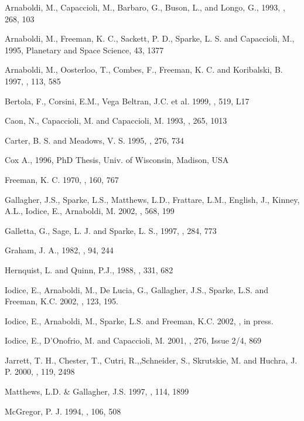 \documentclass{aa}
\begin{document}
\begin{thebibliography}{}

 Arnaboldi, M.,
Capaccioli, M., Barbaro, G., Buson, L., and Longo, G., 1993, \aap, 268, 103

 Arnaboldi, M.,
 Freeman, K. C., Sackett, P. D., Sparke, L. S. and Capaccioli, M., 1995, Planetary and
Space Science, 43, 1377

 Arnaboldi, M., Oosterloo, T., Combes, F., Freeman, K. C. 
and Koribalski, B. 1997, \aj, 113, 585

 Bertola, F., Corsini, E.M., Vega Beltran, J.C. et al. 1999,
\apj, 519, L17 

 Caon, N., Capaccioli, M. and Capaccioli, M. 1993, \mnras, 265, 1013  

 Carter, B. S. and Meadows, V. S. 1995, \mnras, 276, 734  

 Cox A., 1996, PhD Thesis, Univ. of Wisconsin, Madison, USA

 Freeman, K. C. 1970, \apj, 160, 767

 Gallagher, J.S., Sparke, L.S., Matthews, L.D.,
Frattare, L.M., English, J., Kinney, A.L., Iodice, E., Arnaboldi, M. 2002, 
\apj, 568, 199 

 Galletta, G., Sage, L. J.
and Sparke, L. S., 1997, \mnras, 284, 773

 Graham, J. A., 1982, \pasp, 94, 244

 Hernquist, L. and Quinn, P.J., 1988, \apj, 331, 682

 Iodice, E., Arnaboldi, M., De Lucia, G., Gallagher, J.S.,
Sparke, L.S. and Freeman, K.C. 2002, \aj, 123, 195.

 Iodice, E., Arnaboldi, M., Sparke, L.S. and Freeman, K.C. 
2002, \aap, in press.

 Iodice, E., 
D'Onofrio, M.  and Capaccioli, M. 2001, \apss, 276, Issue 2/4, 869

 Jarrett, T. H., Chester, T., Cutri, R.,,Schneider, S., 
Skrutskie, M. and Huchra, J. P. 2000, \aj, 119, 2498

 Matthews, L.D. \& Gallagher, J.S. 1997, \aj, 114, 1899

 McGregor, P. J. 1994, \pasp, 106, 508


\end{thebibliography}
\end{document}
